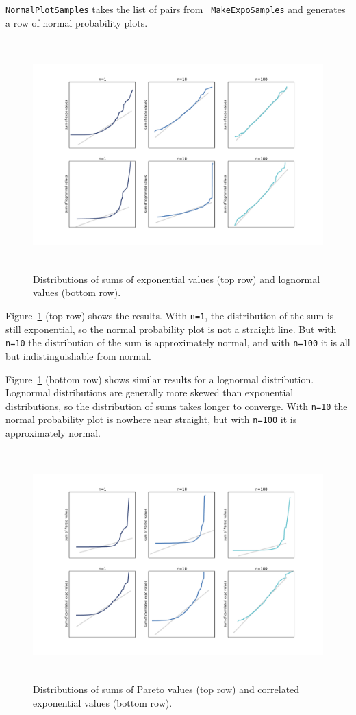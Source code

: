 \documentclass[12pt]{book}
\begin{document}
{\tt NormalPlotSamples} takes the list of pairs from {\tt
  MakeExpoSamples} and generates a row of normal probability plots.

\begin{figure}
\centerline{\includegraphics[height=3.5in]{figs/normal1.pdf}}
\caption{Distributions of sums of exponential values (top row) and
lognormal values (bottom row).}
\label{normal1}
\end{figure}

Figure~\ref{normal1} (top row) shows
the results.  With {\tt n=1}, the distribution of the sum is still
exponential, so the normal probability plot is not a straight line.
But with {\tt n=10} the distribution of the sum is approximately
normal, and with {\tt n=100} it is all but indistinguishable from
normal.

Figure~\ref{normal1} (bottom row) shows similar results for a
lognormal distribution.  Lognormal distributions are generally more
skewed than exponential distributions, so the distribution of sums
takes longer to converge.  With {\tt n=10} the normal
probability plot is nowhere near straight, but with {\tt n=100}
it is approximately normal.

\begin{figure}
\centerline{\includegraphics[height=3.5in]{figs/normal2.pdf}}
\caption{Distributions of sums of Pareto values (top row) and
correlated exponential values (bottom row).}
\label{normal2}
\end{figure}
\end{document}
